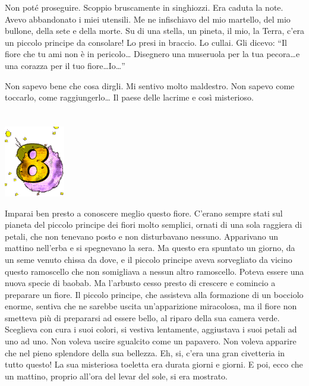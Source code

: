 \documentclass[11pt]{scrbook}
\begin{document}
Non poté proseguire. Scoppio bruscamente in singhiozzi. Era caduta la
note. Avevo abbandonato i miei utensili. Me ne infischiavo del mio
martello, del mio bullone, della sete e della morte. Su di una stella,
un pineta, il mio, la Terra, c'era un piccolo principe da consolare! Lo
presi in braccio. Lo cullai. Gli dicevo: ``Il fiore che tu ami non è in
pericolo\ldots{} Disegnero una museruola per la tua pecora\ldots{}e una
corazza per il tuo fiore\ldots{}Io\ldots{}''

Non sapevo bene che cosa dirgli. Mi sentivo molto maldestro. Non sapevo
come toccarlo, come raggiungerlo\ldots{} Il paese delle lacrime e così
misterioso.

\chapter{}
\begin{center}
\includegraphics{./img/chapter8.png}
\end{center}

Imparai ben presto a conoscere meglio questo fiore. C'erano sempre stati
sul pianeta del piccolo principe dei fiori molto semplici, ornati di una
sola raggiera di petali, che non tenevano posto e non disturbavano
nessuno. Apparivano un mattino nell'erba e si spegnevano la sera. Ma
questo era spuntato un giorno, da un seme venuto chissa da dove, e il
piccolo principe aveva sorvegliato da vicino questo ramoscello che non
somigliava a nessun altro ramoscello. Poteva essere una nuova specie di
baobab. Ma l'arbusto cesso presto di crescere e comincio a preparare un
fiore. Il piccolo principe, che assisteva alla formazione di un bocciolo
enorme, sentiva che ne sarebbe uscita un'apparizione miracolosa, ma il
fiore non smetteva più di prepararsi ad essere bello, al riparo della
sua camera verde. Sceglieva con cura i suoi colori, si vestiva
lentamente, aggiustava i suoi petali ad uno ad uno. Non voleva uscire
sgualcito come un papavero. Non voleva apparire che nel pieno splendore
della sua bellezza. Eh, si, c'era una gran civetteria in tutto questo!
La sua misteriosa toeletta era durata giorni e giorni. E poi, ecco che
un mattino, proprio all'ora del levar del sole, si era mostrato.
\end{document}
